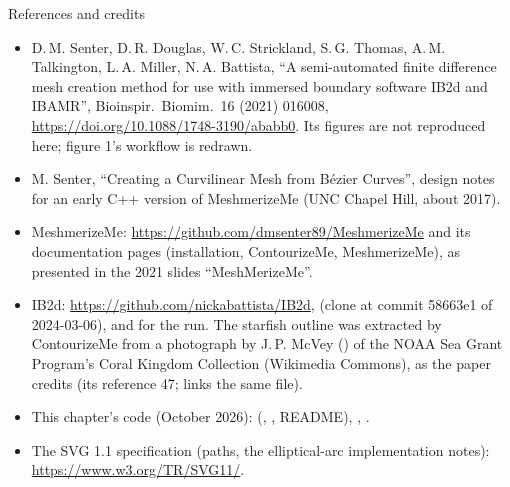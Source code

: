 \documentclass[aspectratio=169,11pt]{beamer}
\begin{document}
\begin{frame}{References and credits}
\label{fr:refs}
\scriptsize
\begin{itemize}
  \item D.\,M. Senter, D.\,R. Douglas, W.\,C. Strickland, S.\,G. Thomas, A.\,M. Talkington, L.\,A. Miller, N.\,A. Battista, ``A semi-automated finite difference mesh creation method for use with immersed boundary software IB2d and IBAMR'', Bioinspir.\ Biomim.\ 16 (2021) 016008, \url{https://doi.org/10.1088/1748-3190/ababb0}. Its figures are not reproduced here; figure 1's workflow is redrawn.
  \item M. Senter, ``Creating a Curvilinear Mesh from B\'ezier Curves'', design notes for an early C++ version of MeshmerizeMe (UNC Chapel Hill, about 2017).
  \item MeshmerizeMe: \url{https://github.com/dmsenter89/MeshmerizeMe} and its documentation pages (installation, ContourizeMe, MeshmerizeMe), as presented in the 2021 slides ``MeshMerizeMe''.
  \item IB2d: \url{https://github.com/nickabattista/IB2d},  (clone at commit 58663e1 of 2024-03-06), and  for the run. The starfish outline was extracted by ContourizeMe from a photograph by J.\,P. McVey () of the NOAA Sea Grant Program's Coral Kingdom Collection (Wikimedia Commons), as the paper credits (its reference 47;  links the same file).
  \item This chapter's code (October 2026):  (, , README), , .
  \item The SVG 1.1 specification (paths, the elliptical-arc implementation notes): \url{https://www.w3.org/TR/SVG11/}.
\end{itemize}
\end{frame}
\end{document}
